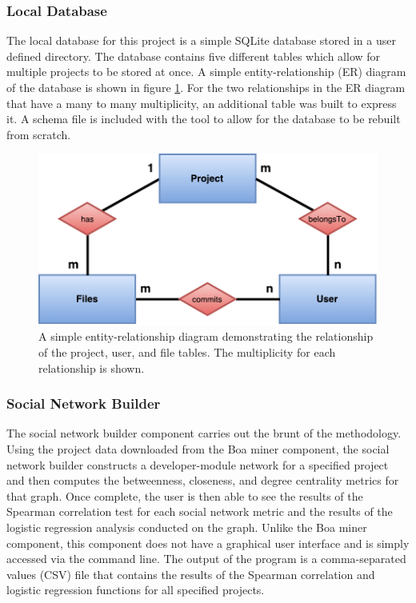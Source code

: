 \documentclass{sig-alternate-05-2015}
\begin{document}
\subsubsection{Local Database}
The local database for this project is a simple SQLite database stored in a user defined directory. The database contains five different tables which allow for multiple projects to be stored at once. A simple entity-relationship (ER) diagram of the database is shown in figure \ref{fig:er}. For the two relationships in the ER diagram that have a many to many multiplicity, an additional table was built to express it. A schema file is included with the tool to allow for the database to be rebuilt from scratch.

\begin{figure}
\centering
\includegraphics[scale=0.5]{er_database}
\caption{A simple entity-relationship diagram demonstrating the relationship of the project, user, and file tables. The multiplicity for each relationship is shown.}
\label{fig:er}
\end{figure}

\subsubsection{Social Network Builder}
The social network builder component carries out the brunt of the methodology. Using the project data downloaded from the Boa miner component, the social network builder constructs a developer-module network for a specified project and then computes the betweenness, closeness, and degree centrality metrics for that graph. Once complete, the user is then able to see the results of the Spearman correlation test for each social network metric and the results of the logistic regression analysis conducted on the graph. Unlike the Boa miner component, this component does not have a graphical user interface and is simply accessed via the command line. The output of the program is a comma-separated values (CSV) file that contains the results of the Spearman correlation and logistic regression functions for all specified projects. 
\end{document}
